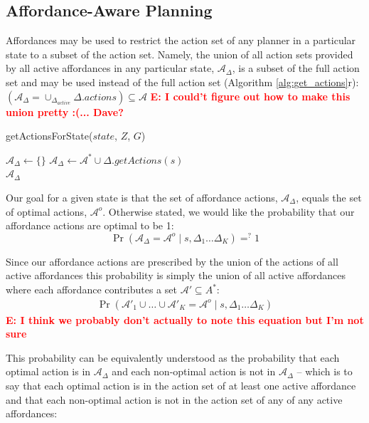 \documentclass[conference]{IEEEtran}
\newcommand{\enote}[1]{\textcolor{Red}{\textbf{E: #1}}}
\begin{document}
\subsection{Affordance-Aware Planning}
Affordances may be used to restrict the action set of any planner in a particular state to a subset of the action set. Namely,  the union of all action sets provided by all active affordances in any particular state, $\mathcal{A}_{\Delta}$, is a subset of the full action set and may be used instead of the full action set (Algorithm \ref{alg:get_actions}r):  $(\mathcal{A}_{\Delta} = \cup_{\Delta_{active}} \Delta.actions) \subseteq \mathcal{A}$ \enote{I could't figure out how to make this union pretty :(... Dave?}
\begin{algorithm}
  \caption{getActionsForState($state$, $Z$, $G$)}
  \begin{algorithmic}[1]
    \State $\mathcal{A}_{\Delta} \leftarrow \{\}$
    \State $\mathcal{A}_{\Delta} \leftarrow \mathcal{A}^* \cup \Delta.getActions(s)$
    \EndIf
    \EndFor \\
    \Return $\mathcal{A}_{\Delta}$
  \end{algorithmic}
    \label{alg:prune_actions}
\end{algorithm}


Our goal for a given state is that the set of affordance actions, $\mathcal{A}_{\Delta}$, equals the set of optimal actions, $\mathcal{A}^o$. Otherwise stated, we would like the probability that our affordance actions are optimal to be 1:
\begin{equation}
\Pr( \mathcal{A}_{\Delta} = \mathcal{A}^o \mid s, \Delta_1 \dots \Delta_K) =^{?} 1
\end{equation}

Since our affordance actions are prescribed by the union of the actions of all active affordances this probability is simply the union of all active affordances where each affordance contributes a set $\mathcal{A}' \subseteq A^*$: 
\begin{align}
\Pr(\mathcal{A}'_1 \cup \ldots \cup \mathcal{A}'_K = \mathcal{A}^o \mid s, \Delta_1 \dots \Delta_K)
\end{align}
\enote{I think we probably don't actually to note this equation but I'm not sure}

This probability can be equivalently understood as the probability that each optimal action is in $\mathcal{A}_{\Delta}$ and each non-optimal action is not in $\mathcal{A}_{\Delta}$ -- which is to say that each optimal action is in the action set of at least one active affordance and that each non-optimal action is not in the action set of any of any active affordances:
\end{document}
